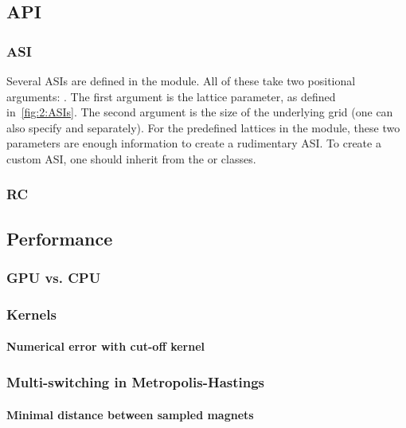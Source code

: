 \subsection{API} %
\subsubsection{ASI}
Several ASIs are defined in the  module.
All of these take two positional arguments: .
The first argument is the lattice parameter, as defined in~\cref{fig:2:ASIs}.
The second argument is the size of the underlying grid (one can also specify  and  separately).
For the predefined lattices in the  module, these two parameters are enough information to create a rudimentary ASI.
To create a custom ASI, one should inherit from the  or  classes.

\subsubsection{RC}
\subsection{Performance} %
\subsubsection{GPU vs. CPU}
\subsubsection{Kernels} %
\paragraph{Numerical error with cut-off kernel}
\subsubsection{Multi-switching in Metropolis-Hastings}
\paragraph{Minimal distance between sampled magnets} %
